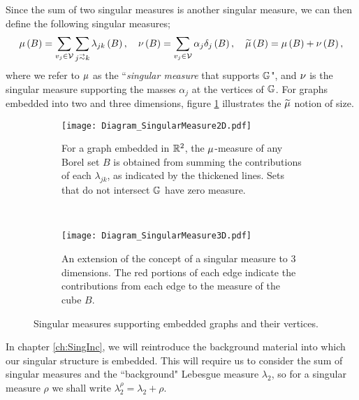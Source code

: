 Since the sum of two singular measures is another singular measure, we can then define the following singular measures;
\begin{align} \label{eq:Intro-MeasureDefs}
	\ddmes\bracs{B} = \sum_{v_j\in \vertSet}\sum_{j\conLeft k} \lambda_{jk}\bracs{B},
	\quad
	\massMes\bracs{B} = \sum_{v_j\in\vertSet}\alpha_j\delta_j\bracs{B},
	\quad
	\dddmes\bracs{B} = \ddmes\bracs{B} + \massMes\bracs{B},
\end{align}
where we refer to $\mu$ as the ``\emph{singular measure} that supports $\mathbb{G}$", and $\nu$ is the singular measure supporting the masses $\alpha_j$ at the vertices of $\mathbb{G}$.
For graphs embedded into two and three dimensions, figure \ref{fig:Diagram_SingularMeasure2D} illustrates the $\widetilde{\mu}$ notion of size.
\begin{figure}[b!]
	\centering
	\begin{subfigure}[t]{0.45\textwidth}
		\centering
		\texttt{[image: Diagram\_SingularMeasure2D.pdf]}
		\caption[]{\label{fig:Diagram_SingularMeasure2D} For a graph embedded in $\mathbb{R}^2$, the $\mu$-measure of any Borel set $B$ is obtained from summing the contributions of each $\lambda_{jk}$, as indicated by the thickened lines. Sets that do not intersect $\mathbb{G}$ have zero measure.}
	\end{subfigure}
	~
	\begin{subfigure}[t]{0.45\textwidth}
		\centering
		\texttt{[image: Diagram\_SingularMeasure3D.pdf]}
		\caption[]{\label{fig:Diagram_SingularMeasure3D} An extension of the concept of a singular measure to 3 dimensions. The red portions of each edge indicate the contributions from each edge to the measure of the cube $B$.}
	\end{subfigure}
	\caption[Singular measures supporting embedded graphs.]{\label{fig:Diagram_SingularMeasure} Singular measures supporting embedded graphs and their vertices.}
\end{figure}
In chapter \ref{ch:SingInc}, we will reintroduce the background material into which our singular structure is embedded.
This will require us to consider the sum of singular measures and the ``background" Lebesgue measure $\lambda_2$, so for a singular measure $\rho$ we shall write $\lambda_2^{\rho} = \lambda_2 + \rho$.